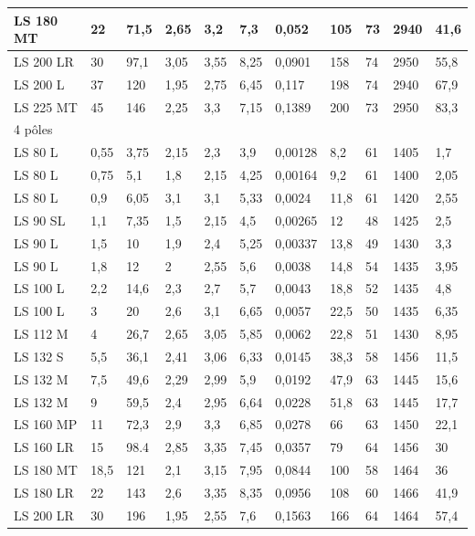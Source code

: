 \documentclass[10pt]{article}
\begin{document}
\begin{table}[h]
\begin{center}
\begin{tabular}[t]{|l|l|l|l|l|l|l|l|l|l|l|}
\hline
LS 180 MT & 22 & 71,5 & 2,65 & 3,2 & 7,3 & 0,052 & 105 & 73 & 2940 & 41,6 \\
\hline
LS 200 LR & 30 & 97,1 & 3,05 & 3,55 & 8,25 & 0,0901 & 158 & 74 & 2950 & 55,8 \\
\hline
LS 200 L & 37 & 120 & 1,95 & 2,75 & 6,45 & 0,117 & 198 & 74 & 2940 & 67,9 \\
\hline
LS 225 MT & 45 & 146 & 2,25 & 3,3 & 7,15 & 0,1389 & 200 & 73 & 2950 & 83,3 \\
\hline
\multicolumn{11}{|l|}{4 pôles} \\
\hline
LS 80 L & 0,55 & 3,75 & 2,15 & 2,3 & 3,9 & 0,00128 & 8,2 & 61 & 1405 & 1,7 \\
\hline
LS 80 L & 0,75 & 5,1 & 1,8 & 2,15 & 4,25 & 0,00164 & 9,2 & 61 & 1400 & 2,05 \\
\hline
LS 80 L & 0,9 & 6,05 & 3,1 & 3,1 & 5,33 & 0,0024 & 11,8 & 61 & 1420 & 2,55 \\
\hline
LS 90 SL & 1,1 & 7,35 & 1,5 & 2,15 & 4,5 & 0,00265 & 12 & 48 & 1425 & 2,5 \\
\hline
LS 90 L & 1,5 & 10 & 1,9 & 2,4 & 5,25 & 0,00337 & 13,8 & 49 & 1430 & 3,3 \\
\hline
LS 90 L & 1,8 & 12 & 2 & 2,55 & 5,6 & 0,0038 & 14,8 & 54 & 1435 & 3,95 \\
\hline
LS 100 L & 2,2 & 14,6 & 2,3 & 2,7 & 5,7 & 0,0043 & 18,8 & 52 & 1435 & 4,8 \\
\hline
LS 100 L & 3 & 20 & 2,6 & 3,1 & 6,65 & 0,0057 & 22,5 & 50 & 1435 & 6,35 \\
\hline
LS 112 M & 4 & 26,7 & 2,65 & 3,05 & 5,85 & 0,0062 & 22,8 & 51 & 1430 & 8,95 \\
\hline
LS 132 S & 5,5 & 36,1 & 2,41 & 3,06 & 6,33 & 0,0145 & 38,3 & 58 & 1456 & 11,5 \\
\hline
LS 132 M & 7,5 & 49,6 & 2,29 & 2,99 & 5,9 & 0,0192 & 47,9 & 63 & 1445 & 15,6 \\
\hline
LS 132 M & 9 & 59,5 & 2,4 & 2,95 & 6,64 & 0,0228 & 51,8 & 63 & 1445 & 17,7 \\
\hline
LS 160 MP & 11 & 72,3 & 2,9 & 3,3 & 6,85 & 0,0278 & 66 & 63 & 1450 & 22,1 \\
\hline
LS 160 LR & 15 & 98.4 & 2,85 & 3,35 & 7,45 & 0,0357 & 79 & 64 & 1456 & 30 \\
\hline
LS 180 MT & 18,5 & 121 & 2,1 & 3,15 & 7,95 & 0,0844 & 100 & 58 & 1464 & 36 \\
\hline
LS 180 LR & 22 & 143 & 2,6 & 3,35 & 8,35 & 0,0956 & 108 & 60 & 1466 & 41,9 \\
\hline
LS 200 LR & 30 & 196 & 1,95 & 2,55 & 7,6 & 0,1563 & 166 & 64 & 1464 & 57,4 \\

\end{tabular}
\end{center}
\end{table}
\end{document}
